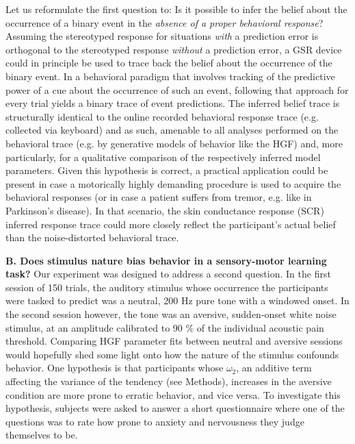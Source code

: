 \documentclass{article}
\begin{document}
\begin{multicols}{2}
Let us reformulate the first question to: Is it possible to infer the belief about the occurrence of a binary event in the \textit{absence of a proper behavioral response}? Assuming the stereotyped response for situations \textit{with} a prediction error is orthogonal to the stereotyped response \textit{without} a prediction error, a GSR device could in principle be used to trace back the belief about the occurrence of the binary event. In a behavioral paradigm that involves tracking of the predictive power of a cue about the occurrence of such an event, following that approach for every trial yields a binary trace of event predictions. The inferred belief trace is structurally identical to the online recorded behavioral response trace (e.g. collected via keyboard) and as such, amenable to all analyses performed on the behavioral trace (e.g. by generative models of behavior like the HGF) and, more particularly, for a qualitative comparison of the respectively inferred model parameters. Given this hypothesis is correct, a practical application could be present in case a motorically highly demanding procedure is used to acquire the behavioral responses (or in case a patient suffers from tremor, e.g. like in Parkinson's disease). In that scenario, the skin conductance response (SCR) inferred response trace could more closely reflect the participant's actual belief than the noise-distorted behavioral trace. \vspace{2mm}

\textbf{B. Does stimulus nature bias behavior in a sensory-motor learning task?}
Our experiment was designed to address a second question. 
In the first session of 150 trials, the auditory stimulus whose occurrence the participants were tasked to predict was a neutral, 200 Hz pure tone with a windowed onset. In the second session however, the tone was an aversive, sudden-onset white noise stimulus, at an amplitude calibrated to 90 \% of the individual acoustic pain threshold. Comparing HGF parameter fits between neutral and aversive sessions would hopefully shed some light onto how the nature of the stimulus confounds behavior. One hypothesis is that participants whose $\omega_{2}$, an additive term affecting the variance of the tendency (see \textsf{Methods}), increases in the aversive condition are more prone to erratic behavior, and vice versa. To investigate this hypothesis, subjects were asked to answer a short questionnaire where one of the questions was to rate how prone to anxiety and nervousness they judge themselves to be. \vspace{2mm} 


\end{multicols}
\end{document}
